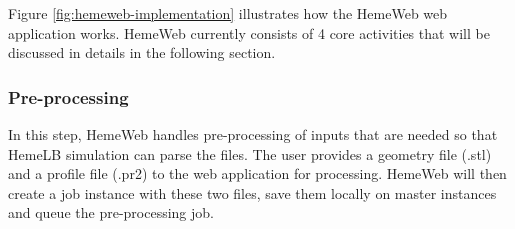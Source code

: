 \noindent%
\begin{minipage}{\linewidth}%
\label{fig:hemeweb-implementation}%
\end{minipage}

\vspace{1cm}

Figure \ref{fig:hemeweb-implementation} illustrates how the HemeWeb web application works. HemeWeb currently consists of 4 core activities that will be discussed in details in the following section.

\subsubsection{Pre-processing}

In this step, HemeWeb handles pre-processing of inputs that are needed so that HemeLB simulation can parse the files. The user provides a geometry file (.stl) and a profile file (.pr2) to the web application for processing. HemeWeb will then create a job instance with these two files, save them locally on master instances and queue the pre-processing job.


\vspace{1cm}

\noindent%
\begin{minipage}{\linewidth}%
\label{fig:hemeweb-pre-processing}%
\end{minipage}

